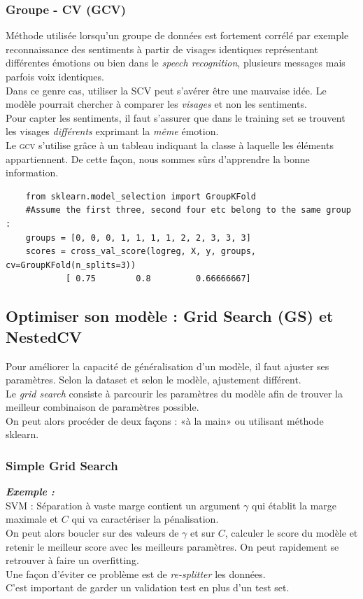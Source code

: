 \documentclass[a4paper,12pt]{report}
\newcommand\bk{\color{black}}
\newcommand\brick{\color{brick}}
\numberwithin{equation}{section} %
\begin{document}
\subsubsection{Groupe - CV (GCV)}
Méthode utilisée lorsqu'un groupe de données est fortement corrélé par exemple reconnaissance des sentiments à partir de visages identiques représentant différentes émotions ou bien dans le \textit{speech recognition}, plusieurs messages mais parfois voix identiques.\\
Dans ce genre cas, utiliser la SCV peut s'avérer être une mauvaise idée. Le modèle pourrait chercher à comparer les \textit{visages} et non les sentiments.\\
Pour capter les sentiments, il faut s'assurer que dans le training set se trouvent les visages \textit{différents} exprimant la \textit{même} émotion.\\

\noindent Le \textsc{gcv} s'utilise grâce à un tableau indiquant la classe à laquelle les éléments appartiennent. De cette façon, nous sommes sûrs d'apprendre la bonne information.
\begin{lstlisting}
	from sklearn.model_selection import GroupKFold	
	#Assume the first three, second four etc belong to the same group :
	groups = [0, 0, 0, 1, 1, 1, 1, 2, 2, 3, 3, 3]
	scores = cross_val_score(logreg, X, y, groups, cv=GroupKFold(n_splits=3))
			[ 0.75        0.8         0.66666667]\end{lstlisting}

\brick \subsection{Optimiser son modèle : Grid Search (GS) et NestedCV} \bk
Pour améliorer la capacité de généralisation d'un modèle, il faut ajuster ses paramètres. Selon la dataset et selon le modèle, ajustement différent.\\
Le \textit{grid search} consiste à parcourir les paramètres du modèle afin de trouver la meilleur combinaison de paramètres possible. \\
On peut alors procéder de deux façons : «à la main» ou utilisant méthode sklearn.
\subsubsection{Simple Grid Search}
\noindent \color{green!40!black!70} \textbf{\textit{Exemple :}} \bk \\
SVM : Séparation à vaste marge contient un argument $\gamma$ qui établit la marge maximale et $C$ qui va caractériser la pénalisation.\\
On peut alors boucler sur des valeurs de $\gamma$ et sur $C$, calculer le score du modèle et retenir le meilleur score avec les meilleurs paramètres. On peut rapidement se retrouver à faire un overfitting.\\
Une façon d'éviter ce problème est de \textit{re-splitter} les données. \\
C'est important de garder un validation test en plus d'un test set.\\
\end{document}
